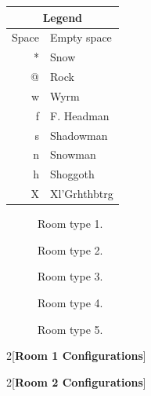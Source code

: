 \documentclass{article}
\begin{document}
\begin{tabular}{|r|l|}
\hline
\multicolumn{2}{|c|}{Legend} \\
\hline
Space & Empty space \\
* & Snow \\
@ & Rock \\
w & Wyrm \\
f & F. Headman \\
s & Shadowman \\
n & Snowman \\
h & Shoggoth \\
X & Xl'Grhthbtrg \\
\hline

\end{tabular}

\begin{figure}[htbp]
	
	\caption{Room type 1.}
	\label{Type1}
\end{figure}

\begin{figure}[htbp]
	
	\caption{Room type 2.}
	\label{Type2}
\end{figure}

\begin{figure}[htbp]
	
	\caption{Room type 3.}
	\label{Type3}
\end{figure}

\begin{figure}[htbp]
	
	\caption{Room type 4.}
	\label{Type4}
\end{figure}

\begin{figure}[htbp]
	
	\caption{Room type 5.}
	\label{Type5}
\end{figure}

\pagebreak

\begin{multicols}{2}[\textbf{Room 1 Configurations}]

\end{multicols}

\pagebreak
\newpage

\begin{multicols}{2}[\textbf{Room 2 Configurations}]

\end{multicols}
\end{document}
